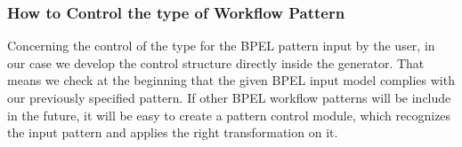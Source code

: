 \subsubsection{How to Control the type of Workflow Pattern}
Concerning the control of the type for the BPEL pattern input by the user, in our  case we develop the control structure directly inside the generator. That means we check at the beginning that the given BPEL input model complies with our previously specified pattern.
If other BPEL workflow patterns will be include in the future, it will be easy to create a pattern control module, which recognizes the input pattern and applies the right transformation on it.